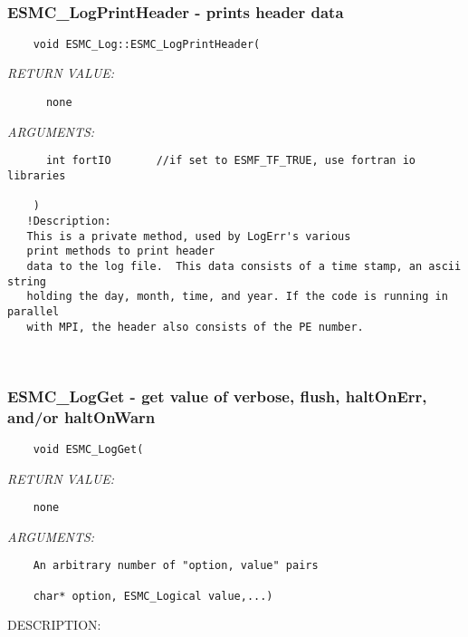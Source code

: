    
 
\mbox{}\hrulefill\ 
 
\subsubsection [ESMC\_LogPrintHeader] {ESMC\_LogPrintHeader - prints header data}


  
\begin{verbatim}    void ESMC_Log::ESMC_LogPrintHeader(\end{verbatim}{\em RETURN VALUE:}
\begin{verbatim}      none \end{verbatim}{\em ARGUMENTS:}
\begin{verbatim}      int fortIO       //if set to ESMF_TF_TRUE, use fortran io libraries
 
    )
   !Description:
   This is a private method, used by LogErr's various
   print methods to print header
   data to the log file.  This data consists of a time stamp, an ascii string 
   holding the day, month, time, and year. If the code is running in parallel
   with MPI, the header also consists of the PE number.\end{verbatim}
 
 
\mbox{}\hrulefill\ 
 
\subsubsection [ESMC\_LogGet] {ESMC\_LogGet - get value of verbose, flush, haltOnErr, and/or haltOnWarn}


  
\begin{verbatim}    void ESMC_LogGet(\end{verbatim}{\em RETURN VALUE:}
\begin{verbatim}    none\end{verbatim}{\em ARGUMENTS:}
\begin{verbatim}    An arbitrary number of "option, value" pairs
 
    char* option, ESMC_Logical value,...)
   \end{verbatim}
{\sf DESCRIPTION:\\ }


